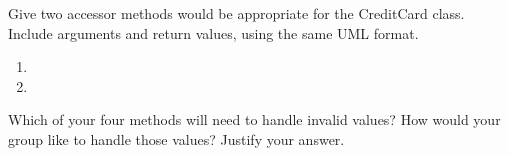 \Q Give two accessor methods would be appropriate for the CreditCard class.
Include arguments and return values, using the same UML format.

\begin{enumerate}
\item 
\item 
\end{enumerate}


\Q Which of your four methods will need to handle invalid values? How would your group like to handle those values? Justify your answer.

\begin{answer}
\end{answer}

